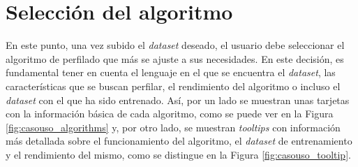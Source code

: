 \section{Selección del algoritmo}
\label{sec:casouso_algoritmo}

En este punto, una vez subido el \textit{dataset} deseado, el usuario debe seleccionar el algoritmo de perfilado que más se ajuste
a sus necesidades. En este decisión, es fundamental tener en cuenta el lenguaje en el que se encuentra el \textit{dataset},
las características que se buscan perfilar, el rendimiento del algoritmo o incluso el \textit{dataset} con el que ha sido entrenado.
Así, por un lado se muestran unas tarjetas con la información básica de cada algoritmo, como se puede ver
en la Figura \ref{fig:casouso_algorithms} y, por otro lado, se muestran \textit{tooltips} con información más detallada
sobre el funcionamiento del algoritmo, el \textit{dataset} de entrenamiento y el rendimiento del mismo, 
como se distingue en la Figura \ref{fig:casouso_tooltip}.

